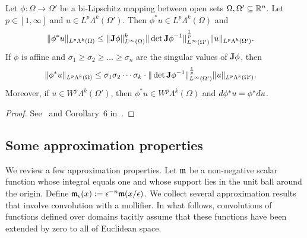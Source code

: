 \documentclass[10pt,a4paper]{article}
\newcommand{\todo}[1]{{\color{RedOrange}\textbf{#1}}}
\begin{document}
\begin{proposition}\label{proposition:pullbackestimate}
    Let $\phi : \Omega \rightarrow \Omega'$ be a bi-Lipschitz mapping between open sets $\Omega, \Omega' \subseteq {\mathbb R}^{n}$.
    Let $p \in [1,\infty]$ and $u \in L^{p}\Lambda^{k}(\Omega')$. 
    Then $\phi^{\ast} u \in L^{p}\Lambda^{k}(\Omega)$ and 
    \begin{align}
        \| \phi^{\ast} u \|_{L^{p}\Lambda^{k}(\Omega)}
        &\leq 
        \| {\mathbf{J}} \phi \|^{k}_{L^{\infty}(\Omega)}
        \| \det{\mathbf{J}} \phi^{-1} \|^{\frac{1}{p}}_{L^{\infty}(\Omega')}
        \| u \|_{L^{p}\Lambda^{k}(\Omega')}
        .
    \end{align}
    If $\phi$ is affine and $\sigma_1 \geq \sigma_2 \geq \dots \geq \sigma_n$ are the singular values of ${\mathbf{J}}\phi$, then 
    \begin{align}
        \| \phi^{\ast} u \|_{L^{p}\Lambda^{k}(\Omega)}
        &\leq 
        \sigma_1 \sigma_2 \cdots \sigma_k \cdot 
        \| \det{\mathbf{J}} \phi^{-1} \|^{\frac{1}{p}}_{L^{\infty}(\Omega')}
        \| u \|_{L^{p}\Lambda^{k}(\Omega')}
        .
    \end{align}
    Moreover, if $u \in W^{p}\Lambda^{k}(\Omega')$, then $\phi^{\ast} u \in W^{p}\Lambda^{k}(\Omega)$ and $d \phi^{\ast} u = \phi^{\ast} d u$. 
\end{proposition}
\begin{proof}
    See~\cite{licht2019smoothed} and Corollary~6 in~\cite{stern2013lp}.
\end{proof}




\subsection{Some approximation properties}

We review a few approximation properties. 
Let ${\mathfrak m}$ be a non-negative scalar function whose integral equals one and whose support lies in the unit ball around the origin.
Define ${\mathfrak m}_{\epsilon}(x) := \epsilon^{-n} {\mathfrak m}(x/\epsilon)$. We collect several approximation results that involve convolution with a mollifier.
In what follows, convolutions of functions defined over domains tacitly assume that these functions have been extended by zero to all of Euclidean space. 

\end{document}
